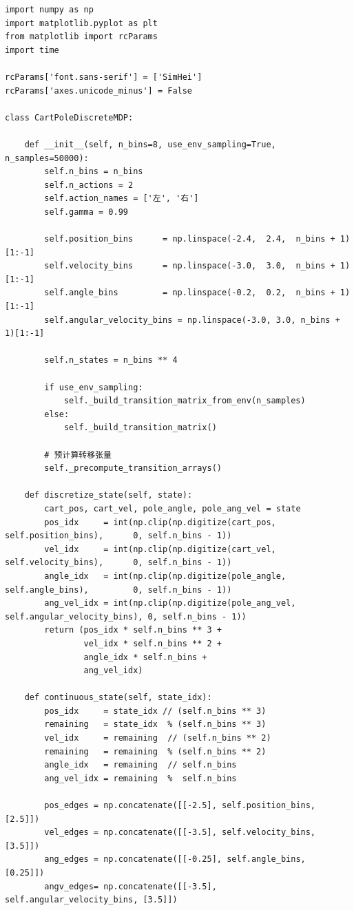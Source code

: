 \documentclass[12pt,a4paper]{article}
\begin{document}
\begin{lstlisting}[caption={策略迭代与值迭代算法完整实现（3.py）}]
import numpy as np
import matplotlib.pyplot as plt
from matplotlib import rcParams
import time

rcParams['font.sans-serif'] = ['SimHei']
rcParams['axes.unicode_minus'] = False

class CartPoleDiscreteMDP:

    def __init__(self, n_bins=8, use_env_sampling=True, n_samples=50000):
        self.n_bins = n_bins
        self.n_actions = 2
        self.action_names = ['左', '右']
        self.gamma = 0.99

        self.position_bins      = np.linspace(-2.4,  2.4,  n_bins + 1)[1:-1]
        self.velocity_bins      = np.linspace(-3.0,  3.0,  n_bins + 1)[1:-1]
        self.angle_bins         = np.linspace(-0.2,  0.2,  n_bins + 1)[1:-1]
        self.angular_velocity_bins = np.linspace(-3.0, 3.0, n_bins + 1)[1:-1]

        self.n_states = n_bins ** 4

        if use_env_sampling:
            self._build_transition_matrix_from_env(n_samples)
        else:
            self._build_transition_matrix()

        # 预计算转移张量
        self._precompute_transition_arrays()

    def discretize_state(self, state):
        cart_pos, cart_vel, pole_angle, pole_ang_vel = state
        pos_idx     = int(np.clip(np.digitize(cart_pos,     self.position_bins),      0, self.n_bins - 1))
        vel_idx     = int(np.clip(np.digitize(cart_vel,     self.velocity_bins),      0, self.n_bins - 1))
        angle_idx   = int(np.clip(np.digitize(pole_angle,   self.angle_bins),         0, self.n_bins - 1))
        ang_vel_idx = int(np.clip(np.digitize(pole_ang_vel, self.angular_velocity_bins), 0, self.n_bins - 1))
        return (pos_idx * self.n_bins ** 3 +
                vel_idx * self.n_bins ** 2 +
                angle_idx * self.n_bins +
                ang_vel_idx)

    def continuous_state(self, state_idx):
        pos_idx     = state_idx // (self.n_bins ** 3)
        remaining   = state_idx  % (self.n_bins ** 3)
        vel_idx     = remaining  // (self.n_bins ** 2)
        remaining   = remaining  % (self.n_bins ** 2)
        angle_idx   = remaining  // self.n_bins
        ang_vel_idx = remaining  %  self.n_bins

        pos_edges = np.concatenate([[-2.5], self.position_bins,         [2.5]])
        vel_edges = np.concatenate([[-3.5], self.velocity_bins,         [3.5]])
        ang_edges = np.concatenate([[-0.25], self.angle_bins,           [0.25]])
        angv_edges= np.concatenate([[-3.5], self.angular_velocity_bins, [3.5]])


\end{lstlisting}
\end{document}
